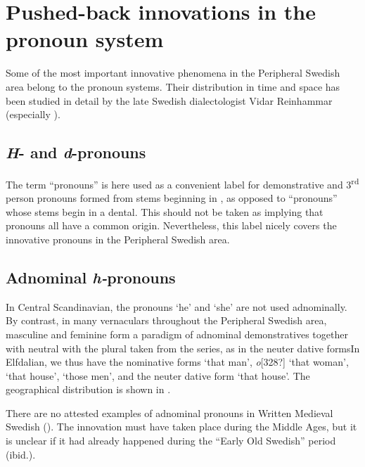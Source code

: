 \section{Pushed-back innovations in the pronoun system}

Some of the most important innovative phenomena in the Peripheral Swedish area belong to the pronoun systems. Their distribution in time and space has been studied in detail by the late Swedish dialectologist Vidar Reinhammar (especially \citealt{Reinhammar1975}). 

\subsection{\textit{H}{}- and \textit{d}-pronouns}

The term “pronouns” is here used as a convenient label for demonstrative and 3\textsuperscript{rd} person pronouns formed from stems beginning in , as opposed to “pronouns” whose stems begin in a dental. This should not be taken as implying that pronouns all have a common origin. Nevertheless, this label nicely covers the innovative pronouns in the Peripheral Swedish area.

\subsection{Adnominal \textit{h-}pronouns}

In Central Scandinavian, the pronouns  ‘he’ and  ‘she’ are not used adnominally. By contrast, in many vernaculars throughout the Peripheral Swedish area, masculine  and feminine  form a paradigm of adnominal demonstratives together with neutral with the plural taken from the series, as in the neuter dative formsIn Elfdalian, we thus have the nominative forms  ‘that man’, \textit{o}[328?] ‘that woman’,  ‘that house’,  ‘those men’, and the neuter dative form ‘that house’. The geographical distribution is shown in . 

There are no attested examples of adnominal pronouns in Written Medieval Swedish (\citealt[114]{Reinhammar1975}). The innovation must have taken place during the Middle Ages, but it is unclear if it had already happened during the “Early Old Swedish” period (ibid.).

